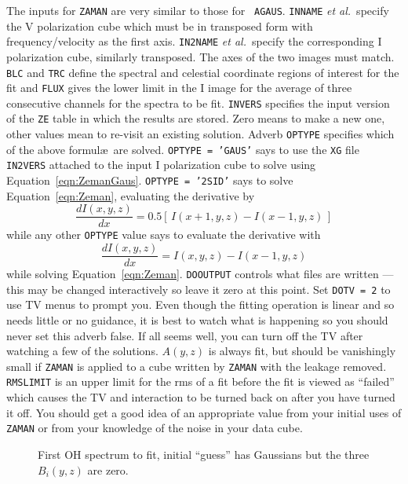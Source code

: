 \documentclass[twoside]{article}
\newcommand{\putfig}[1]{\texttt{[image: \#1.eps]}}
\begin{document}
The inputs for {\tt ZAMAN} are very similar to those for {\tt
  AGAUS}\@.  {\tt INNAME} {\it et al.}~specify the V polarization
cube which must be in transposed form with frequency/velocity as the
first axis.  {\tt IN2NAME} {\it et al.}~specify the corresponding I
polarization cube, similarly transposed.  The axes of the two images
must match.  {\tt BLC} and {\tt TRC} define the spectral and celestial
coordinate regions of interest for the fit and {\tt FLUX} gives
the lower limit in the I image for the average of three consecutive
channels for the spectra to be fit.  {\tt INVERS} specifies the input
version of the {\tt ZE} table in which the results are stored.  Zero
means to make a new one, other values mean to re-visit an existing
solution.  Adverb {\tt OPTYPE} specifies which of the above formul\ae\
are solved.  {\tt OPTYPE = 'GAUS'} says to use the {\tt XG} file {\tt
  IN2VERS} attached to the input I polarization cube to solve using
Equation~\ref{eqn:ZemanGaus}.  {\tt OPTYPE = '2SID'} says to solve
Equation~\ref{eqn:Zeman}, evaluating the derivative by
$$
\frac{dI(x,y,z)}{dx} = 0.5 \left[\, I(x+1,y,z) - I(x-1,y,z) \,\right]
$$
while any other {\tt OPTYPE} value says to evaluate the derivative
with
$$
\frac{dI(x,y,z)}{dx} = I(x,y,z) - I(x-1,y,z)
$$
while solving Equation~\ref{eqn:Zeman}.  {\tt DOOUTPUT} controls what
files are written --- this may be changed interactively so leave it
zero at this point.  Set {\tt DOTV = 2} to use TV menus to prompt you.
Even though the fitting operation is linear and so needs little or no
guidance, it is best to watch what is happening so you should never
set this adverb false.  If all seems well, you can turn off the TV
after watching a few of the solutions.  $A(y,z)$ is always fit, but
should be vanishingly small if {\tt ZAMAN} is applied to a cube
written by {\tt ZAMAN} with the leakage removed.  {\tt RMSLIMIT} is an
upper limit for the rms of a fit before the fit is viewed as
``failed'' which causes the TV and interaction to be turned back on
after you have turned it off.  You should get a good idea of an
appropriate value from your initial uses of {\tt ZAMAN} or from your
knowledge of the noise in your data cube.

\begin{figure}
\begin{center}
\resizebox{6.0in}{!}{\putfig{ZAMAN.init}}
\caption{First OH spectrum to fit, initial ``guess'' has Gaussians but
   the three $B_i(y,z)$ are zero.}
\label{fig:ZAMAN.init}
\end{center}
\end{figure}
\end{document}
